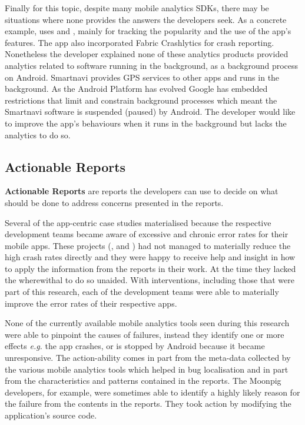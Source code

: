 Finally for this topic, despite many mobile analytics SDKs, there may be situations where none provides the answers the developers seek. As a concrete example,  uses  and , mainly for tracking the popularity and the use of the app's features. The app also incorporated Fabric Crashlytics for crash reporting. Nonetheless the developer explained none of these analytics products provided analytics related to software running in the background, as a background process on Android. Smartnavi provides GPS services to other apps and runs in the background. As the Android Platform has evolved Google has embedded restrictions that limit and constrain background processes which meant the Smartnavi software is suspended (paused) by Android. The developer would like to improve the app's behaviours when it runs in the background but lacks the analytics to do so.

\subsection{Actionable Reports}
\textbf{Actionable Reports} are reports the developers can use to decide on what should be done to address concerns presented in the reports. %

Several of the app-centric case studies materialised because the respective development teams became aware of excessive and chronic error rates for their mobile apps. %
These projects (,  and ) had not managed to materially reduce the high crash rates directly and they were happy to receive help and insight in how to apply the information from the reports in their work. At the time they lacked the wherewithal to do so unaided. With interventions, including those that were part of this research, each of the development teams were able to materially improve the error rates of their respective apps.

None of the currently available mobile analytics tools seen during this research were able to pinpoint the causes of failures, instead they identify one or more effects \emph{e.g.} the app crashes, or is stopped by Android because it became unresponsive. The action-ability comes in part from the meta-data collected by the various mobile analytics tools which helped in bug localisation and in part from the characteristics and patterns contained in the reports. The Moonpig developers, for example, were sometimes able to identify a highly likely reason for the failure from the contents in the reports. They took action by modifying the application's source code.


